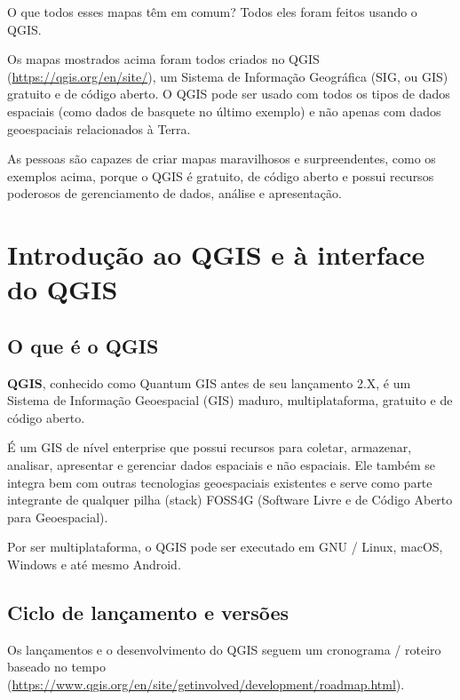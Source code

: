 \documentclass[
]{krantz}
\begin{document}
O que todos esses mapas têm em comum? Todos eles foram feitos usando o QGIS.

Os mapas mostrados acima foram todos criados no QGIS (\url{https://qgis.org/en/site/}), um Sistema de Informação Geográfica (SIG, ou GIS) gratuito e de código aberto. O QGIS pode ser usado com todos os tipos de dados espaciais (como dados de basquete no último exemplo) e não apenas com dados geoespaciais relacionados à Terra.

As pessoas são capazes de criar mapas maravilhosos e surpreendentes, como os exemplos acima, porque o QGIS é gratuito, de código aberto e possui recursos poderosos de gerenciamento de dados, análise e apresentação.

\hypertarget{introduuxe7uxe3o-ao-qgis-e-uxe0-interface-do-qgis}{%
\section{Introdução ao QGIS e à interface do QGIS}\label{introduuxe7uxe3o-ao-qgis-e-uxe0-interface-do-qgis}}

\hypertarget{o-que-uxe9-o-qgis}{%
\subsection{O que é o QGIS}\label{o-que-uxe9-o-qgis}}

\textbf{QGIS}, conhecido como Quantum GIS antes de seu lançamento 2.X, é um Sistema de Informação Geoespacial (GIS) maduro, multiplataforma, gratuito e de código aberto.

É um GIS de nível enterprise que possui recursos para coletar, armazenar, analisar, apresentar e gerenciar dados espaciais e não espaciais. Ele também se integra bem com outras tecnologias geoespaciais existentes e serve como parte integrante de qualquer pilha (stack) FOSS4G (Software Livre e de Código Aberto para Geoespacial).

Por ser multiplataforma, o QGIS pode ser executado em GNU / Linux, macOS, Windows e até mesmo Android.

\hypertarget{ciclo-de-lanuxe7amento-e-versuxf5es}{%
\subsection{Ciclo de lançamento e versões}\label{ciclo-de-lanuxe7amento-e-versuxf5es}}

Os lançamentos e o desenvolvimento do QGIS seguem um cronograma / roteiro baseado no tempo (\href{https://www.qgis.org/en/site/\%20getinvolved\%20/\%20development\%20/\%20roadmap.html}{https://www.qgis.org/en/site/getinvolved/development/roadmap.html}).
\end{document}
